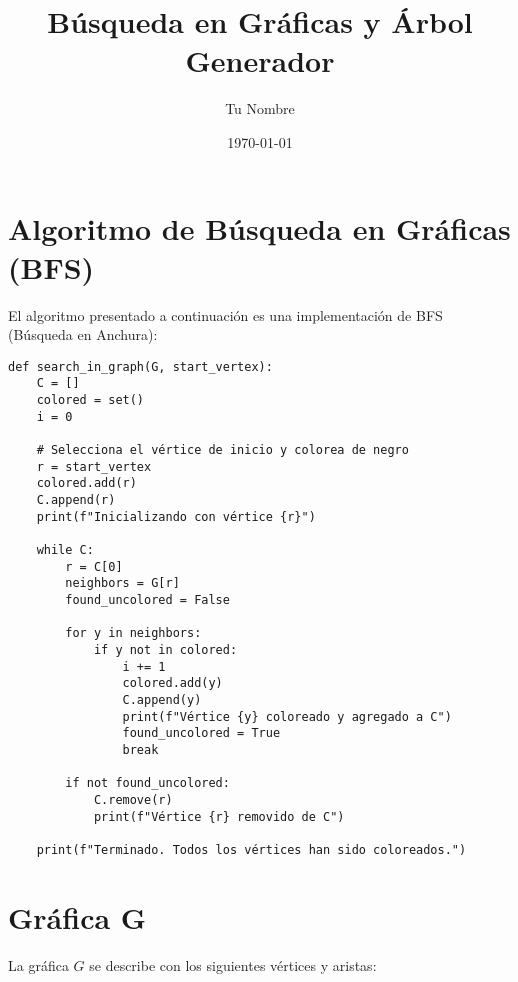 \documentclass{article}
\title{Búsqueda en Gráficas y Árbol Generador}
\author{Tu Nombre}
\date{\today}
\begin{document}
\maketitle

\section{Algoritmo de Búsqueda en Gráficas (BFS)}

El algoritmo presentado a continuación es una implementación de BFS (Búsqueda en Anchura):

\begin{lstlisting}
def search_in_graph(G, start_vertex):
    C = []
    colored = set()
    i = 0

    # Selecciona el vértice de inicio y colorea de negro
    r = start_vertex
    colored.add(r)
    C.append(r)
    print(f"Inicializando con vértice {r}")

    while C:
        r = C[0]
        neighbors = G[r]
        found_uncolored = False
        
        for y in neighbors:
            if y not in colored:
                i += 1
                colored.add(y)
                C.append(y)
                print(f"Vértice {y} coloreado y agregado a C")
                found_uncolored = True
                break
        
        if not found_uncolored:
            C.remove(r)
            print(f"Vértice {r} removido de C")

    print(f"Terminado. Todos los vértices han sido coloreados.")
\end{lstlisting}

\section{Gráfica G}

La gráfica \( G \) se describe con los siguientes vértices y aristas:

\end{document}
